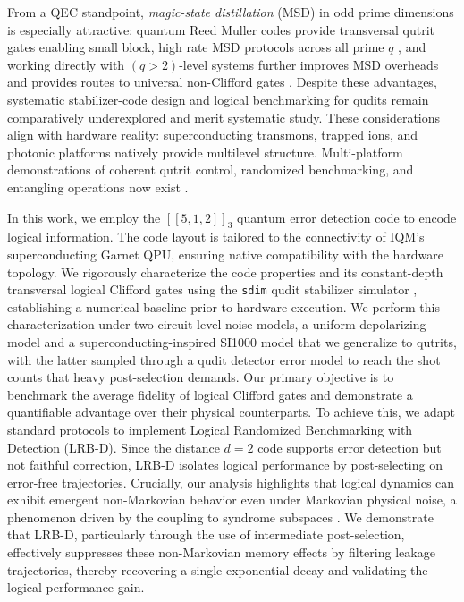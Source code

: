 From a QEC standpoint, \emph{magic-state distillation} (MSD) in odd prime dimensions is especially attractive: quantum Reed Muller codes provide transversal qutrit gates enabling small block, high rate MSD protocols across all prime \(q\) \cite{CampbellPRX2012}, and working directly with \((q>2)\)-level systems further improves MSD overheads and provides routes to universal non-Clifford gates \cite{CampbellPRL2014}. Despite these advantages, systematic stabilizer-code design and logical benchmarking for qudits remain comparatively underexplored and merit systematic study. These considerations align with hardware reality: superconducting transmons, trapped ions, and photonic platforms natively provide multilevel structure.  Multi-platform demonstrations of coherent qutrit control, randomized benchmarking, and entangling operations now exist \cite{Morvan2021,Ringbauer2022,Goss2024}.

In this work, we employ the $[[5,1,2]]_3$ quantum error detection code to encode logical information. The code layout is tailored to the connectivity of IQM’s superconducting Garnet QPU, ensuring native compatibility with the hardware topology. We rigorously characterize the code properties and its constant-depth transversal logical Clifford gates using the \texttt{sdim} qudit stabilizer simulator \cite{sdim}, establishing a numerical baseline prior to hardware execution. We perform this characterization under two circuit-level noise models, a uniform depolarizing model and a superconducting-inspired SI1000 model \cite{GidneyHoneycomb2021} that we generalize to qutrits, with the latter sampled through a qudit detector error model to reach the shot counts that heavy post-selection demands. Our primary objective is to benchmark the average fidelity of logical Clifford gates and demonstrate a quantifiable advantage over their physical counterparts. To achieve this, we adapt standard protocols to implement Logical Randomized Benchmarking with Detection (LRB-D). Since the distance $d=2$ code supports error detection but not faithful correction, LRB-D isolates logical performance by post-selecting on error-free trajectories. Crucially, our analysis highlights that logical dynamics can exhibit emergent non-Markovian behavior even under Markovian physical noise, a phenomenon driven by the coupling to syndrome subspaces \cite{Ziyad2025}. We demonstrate that LRB-D, particularly through the use of intermediate post-selection, effectively suppresses these non-Markovian memory effects by filtering leakage trajectories, thereby recovering a single exponential decay and validating the logical performance gain.